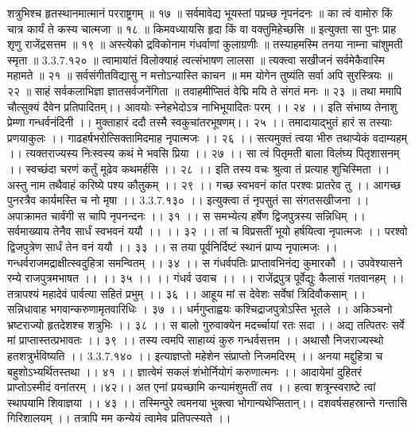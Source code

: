 शत्रुभिश्च हृतस्थानमात्मानं परराष्ट्रगम् ॥ १७ ॥
सर्वमावेद्य भूयस्तां पप्रच्छ नृपनंदनः ॥
का त्वं वामोरु किं चात्र कार्यं ते कस्य चात्मजा ॥ १८ ॥
किमवध्यायसि हृदा किं वा वक्तुमिहेच्छसि ॥
इत्युक्ता सा पुनः प्राह शृणु राजेंद्रसत्तम ॥ १९ ॥
अस्त्येको द्रविकोनाम गंधर्वाणां कुलाग्रणीः ॥
तस्याहमस्मि तनया नाम्ना चांशुमती स्मृता ॥ 3.3.7.१२० ॥
त्वामायांतं विलोक्याहं त्वत्संभाषण लालसा ॥
त्यक्त्वा सखीजनं सर्वमेकैवास्मि महामते ॥ २१ ॥
सर्वसंगीतविद्यासु न मत्तोऽन्यास्ति काचन ॥
मम योगेन तुष्यंति सर्वा अपि सुरस्त्रियः ॥ २२ ॥
साहं सर्वकलाभिज्ञा ज्ञातसर्वजनेंगिता ॥
तवाहमीप्सितं वेद्मि मयि ते संगतं मनः ॥ २३ ॥
तथा ममापि चौत्सुक्यं दैवेन प्रतिपादितम्।।
आवयोः स्नेहभेदोऽत्र नाभिभूयादितः परम् ।। २४ ।।
इति संभाष्य तेनाशु प्रेम्णा गन्धर्वनंदिनी ।।
मुक्ताहारं ददौ तस्मै स्वकुचांतरभूषणम्।। २५ ।।
तमादायाद्भुतं हारं स तस्याः प्रणयाकुलः ।।
गाढहर्षभरोत्सिक्तामिदमाह नृपात्मजः ।। २६ ।।
सत्यमुक्तं त्वया भीरु तथाप्येकं वदाम्यहम् ।।
त्यक्तराज्यस्य निःस्वस्य कथं मे भवसि प्रिया ।। २७ ।।
सा त्वं पितृमती बाला विलंघ्य पितृशासनम् ।।
स्वच्छंदा चरणं कर्तुं मूढेव कथमर्हसि ।। २८ ।।
इति तस्य वचः श्रुत्वा तं प्रत्याह शुचिस्मिता ।।
अस्तु नाम तथैवाहं करिष्ये पश्य कौतुकम् ।। २९ ।।
गच्छ स्वभवनं कांत परश्वः प्रातरेव तु ।।
आगच्छ पुनरत्रैव कार्यमस्ति च नो मृषा ।। 3.3.7.१३० ।।
इत्युक्त्वा तं नृपसुतं सा संगतसखीजना ।।
अपाक्रामत चार्वंगी स चापि नृपनन्दनः ।। ३१ ।।
स समभ्येत्य हर्षेण द्विजपुत्रस्य सन्निधिम् ।।
सर्वमाख्याय तेनैव सार्धं स्वभवनं ययौ ।। ।। ३२ ।।
तां च विप्रसतीं भूयो हर्षयित्वा नृपात्मजः ।।
परश्वो द्विजपुत्रेण सार्धं तेन वनं ययौ ।। ३३ ।।
स तया पूर्वनिर्दिष्टं स्थानं प्राप्य नृपात्मजः ।।
गन्धर्वराजमद्राक्षीत्स्वदुहित्रा समन्वितम् ।। ३४ ।।
स गंधर्वपतिः प्राप्तावभिनंद्य कुमारकौ ।।
उपवेश्यासने रम्ये राजपुत्रमभाषत ।। ।। ३५ ।।
।। गंधर्व उवाच ।। ।।
राजेंद्रपुत्र पूर्वेद्युः कैलासं गतवानहम् ।।
तत्रापश्यं महादेवं पार्वत्या सहितं प्रभुम् ।। ३६ ।।
आहूय मां स देवेशः सर्वेषां त्रिदिवौकसाम् ।।
सन्निधावाह भगवान्करुणामृतवारिधिः । ३७ ।।
धर्मगुप्ताह्वयः कश्चिद्राजपुत्रोऽस्ति भूतले ।।
अकिञ्चनो भ्रष्टराज्यो हृतदेशश्च शत्रुभिः ।। ३८ ।।
स बालो गुरुवाक्येन मदर्च्चायां रतः सदा ।।
अद्य तत्पितरः सर्वे मां प्राप्तास्तत्प्रभावतः ।। ३९ ।।
तस्य त्वमपि साहाय्यं कुरु गन्धर्वसत्तम ।।
अथासौ निजराज्यस्थो हतशत्रुर्भविष्यति ।। 3.3.7.१४० ।।
इत्याज्ञप्तो महेशेन संप्राप्तो निजमदिरम् ।।
अनया मद्दुहित्रा च बहुशोऽभ्यर्थितस्तथा ।। ४१ ।।
ज्ञात्वेमं सकलं शंभोर्नियोगं करुणात्मनः ।।
आदायेमां दुहितरं प्राप्तोऽस्मीदं वनांतरम् ।।४२।।
अत एनां प्रयच्छामि कन्यामंशुमतीं तव ।।
हत्वा शत्रून्स्वराष्टे त्वां स्थापयामि शिवाज्ञया ।। ४३ ।।
तस्मिन्पुरे त्वमनया भुक्त्वा भोगान्यथेप्सितान्।।
दशवर्षसहस्रान्ते गन्तासि गिरिशालयम् ।।
तत्रापि मम कन्येयं त्वामेव प्रतिपत्स्यते ।।
